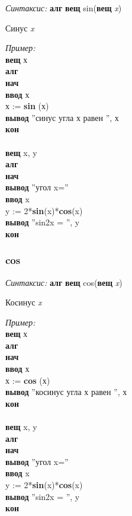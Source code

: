 \emph{Синтаксис:} \textbf{алг} \textbf{вещ} sin(\textbf{вещ} \emph{x})


  
    
		Синус \emph{x}

      
\emph{Пример:} 
\sffamily
~\\\textbf{вещ} х
~\\\textbf{алг 
~\\нач
~\\\otstup ввод} х
~\\\otstup х := \textbf{sin} (х)
~\\\otstup \textbf{вывод} ''синус угла х равен '', х
~\\\textbf{кон}
~\\
~\\\textbf{вещ} x, y
~\\\textbf{алг 
~\\нач
~\\\otstup вывод} ''угол x=''
~\\\otstup \textbf{ввод} x
~\\\otstup y := 2*\textbf{sin}(x)*\textbf{cos}(x)
~\\\otstup \textbf{вывод} ''sin2x = '', y
~\\\textbf{кон}


\normalfont
\subsubsection{cos}

\emph{Синтаксис:} \textbf{алг} \textbf{вещ} cos(\textbf{вещ} \emph{x})


     
 
		Косинус \emph{x}
      
\emph{Пример:} 
\sffamily
~\\\textbf{вещ} х
~\\\textbf{алг 
~\\нач
~\\\otstup ввод} х
~\\\otstup х := \textbf{cos} (х)
~\\\otstup \textbf{вывод} ''косинус угла х равен '', х
~\\\textbf{кон}
~\\
~\\\textbf{вещ} x, y
~\\\textbf{алг 
~\\нач
~\\\otstup вывод} ''угол x=''
~\\\otstup \textbf{ввод} x
~\\\otstup y := 2*\textbf{sin}(x)*\textbf{cos}(x)
~\\\otstup \textbf{вывод} ''sin2x = '', y
~\\\textbf{кон}

